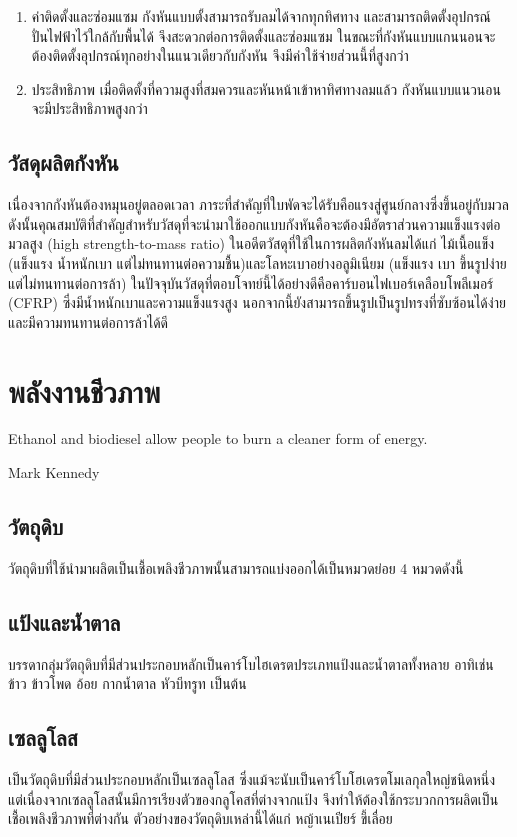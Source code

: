 \documentclass[a4paper,nobib,openany,10pt]{tufte-book}
\begin{document}
\begin{enumerate}
\item ค่าติดตั้งและซ่อมแซม กังหันแบบตั้งสามารถรับลมได้จากทุกทิศทาง
และสามารถติดตั้งอุปกรณ์ปั่นไฟฟ้าไว้ใกล้กับพื้นได้
จึงสะดวกต่อการติดตั้งและซ่อมแซม
ในขณะที่กังหันแบบแกนนอนจะต้องติดตั้งอุปกรณ์ทุกอย่างในแนวเดียวกับกังหัน
จึงมีค่าใช้จ่ายส่วนนี้ที่สูงกว่า

\item ประสิทธิภาพ
เมื่อติดตั้งที่ความสูงที่สมควรและหันหน้าเข้าหาทิศทางลมแล้ว
กังหันแบบแนวนอนจะมีประสิทธิภาพสูงกว่า
\end{enumerate}

\section{วัสดุผลิตกังหัน}
\label{sec:orgc366559}
เนื่องจากกังหันต้องหมุนอยู่ตลอดเวลา
ภาระที่สำคัญที่ใบพัดจะได้รับคือแรงสู่ศูนย์กลางซึ่งขึ้นอยู่กับมวล
ดังนั้นคุณสมบัติที่สำคัญสำหรับวัสดุที่จะนำมาใช้ออกแบบกังหันคือจะต้องมีอัตราส่วนความแข็งแรงต่อมวลสูง
(high strength-to-mass ratio) ในอดีตวัสดุที่ใช้ในการผลิตกังหันลมได้แก่
ไม้เนื้อแข็ง (แข็งแรง น้ำหนักเบา
แต่ไม่ทนทานต่อความชื้น)และโลหะเบาอย่างอลูมิเนียม (แข็งแรง เบา
ขึ้นรูปง่าย แต่ไม่ทนทานต่อการล้า)
ในปัจจุบันวัสดุที่ตอบโจทย์นี้ได้อย่างดีคือคาร์บอนไฟเบอร์เคลือบโพลีเมอร์
(CFRP) ซึ่งมีน้ำหนักเบาและความแข็งแรงสูง
นอกจากนี้ยังสามารถขึ้นรูปเป็นรูปทรงที่ซับซ้อนได้ง่ายและมีความทนทานต่อการล้าได้ดี

\chapter{พลังงานชีวภาพ}
\label{sec:org86bbecf}

\epigraph{Ethanol and biodiesel allow people to burn a cleaner form of energy.}{Mark Kennedy}

\section{วัตถุดิบ}
\label{sec:org2907e30}
วัตถุดิบที่ใช้นำมาผลิตเป็นเชื้อเพลิงชีวภาพนั้นสามารถแบ่งออกได้เป็นหมวดย่อย
4 หมวดดังนี้

\section{แป้งและน้ำตาล}
\label{sec:org901c300}
บรรดากลุ่มวัตถุดิบที่มีส่วนประกอบหลักเป็นคาร์โบไฮเดรตประเภทแป้งและน้ำตาลทั้งหลาย
อาทิเช่น ข้าว ข้าวโพด อ้อย กากน้ำตาล หัวบีทรูท เป็นต้น

\section{เซลลูโลส}
\label{sec:orgb6e41b9}
เป็นวัตถุดิบที่มีส่วนประกอบหลักเป็นเซลลูโลส
ซึ่งแม้จะนับเป็นคาร์โบโฮเดรตโมเลกุลใหญ่ชนิดหนึ่ง
แต่เนื่องจากเซลลูโลสนั้นมีการเรียงตัวของกลูโคสที่ต่างจากแป้ง
จึงทำให้ต้องใช้กระบวกการผลิตเป็นเชื้อเพลิงชีวภาพที่ต่างกัน
ตัวอย่างของวัตถุดิบเหล่านี้ได้แก่ หญ้าเนเปียร์ ขี้เลื่อย
\end{document}
